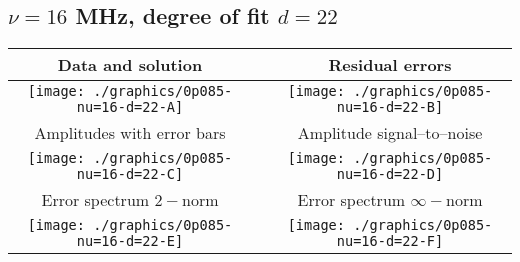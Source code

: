 

% 

\clearpage{}
\break{}

\subsection{$\nu = 16$ MHz, degree of fit $d = 22$}

\begin{table}[h]
    \begin{center}
        \begin{tabular}{ccc}
            Data and solution & \quad & Residual errors \\\hline
            \texttt{[image: ./graphics/0p085-nu=16-d=22-A]} &&
            \texttt{[image: ./graphics/0p085-nu=16-d=22-B]} \\[15pt]
            Amplitudes with error bars && Amplitude signal--to--noise \\\hline
            \texttt{[image: ./graphics/0p085-nu=16-d=22-C]} &&
            \texttt{[image: ./graphics/0p085-nu=16-d=22-D]} \\[15pt]
            Error spectrum $2-$norm && Error spectrum $\infty-$norm \\\hline
            \texttt{[image: ./graphics/0p085-nu=16-d=22-E]} &&
            \texttt{[image: ./graphics/0p085-nu=16-d=22-F]} \\[15pt]
        \end{tabular}
    \end{center}
\label{fig:elev=85, nu=16}
\end{table}



\endinput
